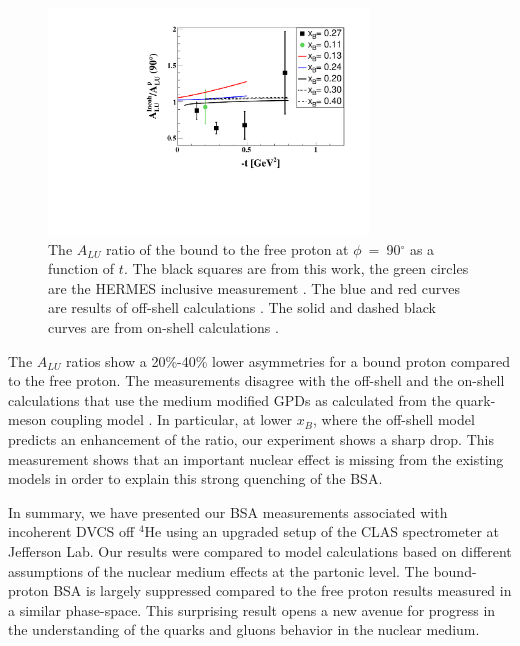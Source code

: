\documentclass[twocolumn,nofootinbib,showpacs,prl,superscriptaddress,secnumarabic,amssymb,nobibnotes,aps,floatfix]{revtex4}
\begin{document}
\begin{figure}[tb]
\centering
\includegraphics[width=8.5cm]{figs/ALU_ratioInc_t_shortscenrario.pdf}
\caption{ The $A_{LU}$ ratio of the bound to the free proton at 
   $\phi$~=~90$^{\circ}$ as a function of $t$. The black squares are from this 
   work, the green circles are the HERMES inclusive measurement 
   \cite{Airapetian:2009cga}. The blue and red curves are results of off-shell 
   calculations \cite{simonetta_2}. The solid and dashed black curves are from 
   on-shell calculations \cite{Guzey:2008fe}.} 
   \label{fig:incoh_EMC_ratio_ALU_proton}
\end{figure}

The $A_{LU}$ ratios show a 20\%-40\% lower asymmetries for a bound proton compared 
to the free proton. The measurements disagree with the off-shell \cite{simonetta_2} 
and the on-shell calculations that use the medium modified GPDs as calculated from 
the quark-meson coupling model \cite{Guzey:2008fe}. In particular, at lower $x_B$, 
where the off-shell model predicts an enhancement of the ratio, our experiment 
shows a sharp drop. This measurement shows that an important nuclear effect is
missing from the existing models in order to explain this strong quenching of
the BSA.


In summary, we have presented our BSA measurements 
associated with incoherent DVCS off $^4$He using an upgraded setup of the CLAS 
spectrometer at Jefferson Lab. Our results were compared to model 
calculations based on different assumptions of the nuclear medium effects at 
the partonic level.  The bound-proton 
BSA is largely suppressed compared to the free proton 
results measured in a similar phase-space. This surprising result opens a new avenue 
for progress in the understanding of the quarks and gluons behavior in the
nuclear medium.
\end{document}
